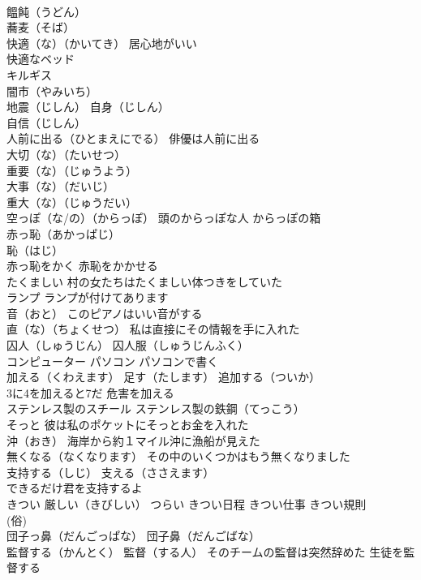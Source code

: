 \documentclass[8pt]{extreport}
\begin{document}
\begin{CJK}{UTF8}{min}
\\	饂飩（うどん）
\\	蕎麦（そば） 
\\	快適（な）（かいてき） 居心地がいい 
\\	快適なベッド
\\	キルギス
\\	闇市（やみいち）
\\	地震（じしん） 自身（じしん）
\\	自信（じしん）
\\	人前に出る（ひとまえにでる） 俳優は人前に出る
\\	大切（な）（たいせつ）
\\	重要（な）（じゅうよう）
\\	大事（な）（だいじ）
\\	重大（な）（じゅうだい）
\\	空っぽ（な/の）（からっぽ） 頭のからっぽな人 からっぽの箱
\\	赤っ恥（あかっぱじ）
\\	恥（はじ）
\\	赤っ恥をかく 赤恥をかかせる
\\	たくましい 村の女たちはたくましい体つきをしていた
\\	ランプ ランプが付けてあります
\\	音（おと） このピアノはいい音がする
\\	直（な）（ちょくせつ） 私は直接にその情報を手に入れた
\\	囚人（しゅうじん） 囚人服（しゅうじんふく）
\\	コンピューター パソコン パソコンで書く
\\	加える（くわえます） 足す（たします） 追加する（ついか）
\\	3に4を加えると7だ 危害を加える
\\	ステンレス製のスチール ステンレス製の鉄鋼（てっこう）
\\	そっと 彼は私のポケットにそっとお金を入れた
\\	沖（おき） 海岸から約１マイル沖に漁船が見えた
\\	無くなる（なくなります） その中のいくつかはもう無くなりました
\\	支持する（しじ） 支える（ささえます）
\\	できるだけ君を支持するよ
\\	きつい 厳しい（きびしい） つらい きつい日程 きつい仕事 きつい規則
\\	(俗) 
\\	団子っ鼻（だんごっぱな） 団子鼻（だんごばな）
\\	監督する（かんとく） 監督（する人） そのチームの監督は突然辞めた 生徒を監督する

\end{CJK}
\end{document}
